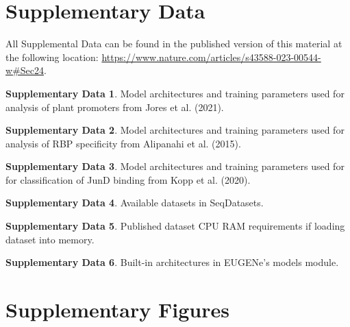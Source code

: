 \section{Supplementary Data}
All Supplemental Data can be found in the published version of this material at the following location: \url{https://www.nature.com/articles/s43588-023-00544-w#Sec24}.

\noindent
\textbf{Supplementary Data 1}. Model architectures and training parameters used for analysis of plant promoters from Jores et al. (2021).

\noindent
\textbf{Supplementary Data 2}. Model architectures and training parameters used for analysis of RBP specificity from Alipanahi et al. (2015).

\noindent
\textbf{Supplementary Data 3}. Model architectures and training parameters used for for classification of JunD binding from Kopp et al. (2020).

\noindent
\textbf{Supplementary Data 4}. Available datasets in SeqDatasets.

\noindent
\textbf{Supplementary Data 5}. Published dataset CPU RAM requirements if loading dataset into memory.

\noindent
\textbf{Supplementary Data 6}. Built-in architectures in EUGENe’s models module.


\section{Supplementary Figures}

